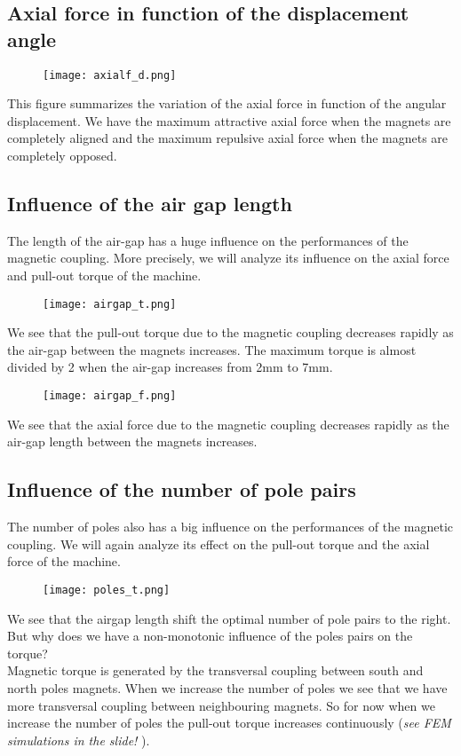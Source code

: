 \subsection*{Axial force in function of the displacement angle}
\begin{figure}[H]
    \centering
    \texttt{[image: axialf\_d.png]}
\end{figure}
This figure summarizes the variation of the axial force in function of the angular displacement. We have the maximum attractive axial force when the magnets are completely aligned and the maximum repulsive axial force when the magnets are completely opposed.

\subsection*{Influence of the air gap length}

The length of the air-gap has a huge influence on the performances of the magnetic coupling. More precisely, we will analyze its influence on the axial force and pull-out torque of the machine.
\begin{figure}[H]
    \centering
    \texttt{[image: airgap\_t.png]}
\end{figure}
We see that the pull-out torque due to the magnetic coupling decreases rapidly as the air-gap between the magnets increases. The maximum torque is almost divided by 2 when the air-gap increases from 2mm to 7mm.
\begin{figure}[H]
    \centering
    \texttt{[image: airgap\_f.png]}
\end{figure}
We see that the axial force due to the magnetic coupling decreases rapidly as the air-gap length between the magnets increases.

\subsection*{Influence of the number of pole pairs}
The number of poles also has a big influence on the performances of the magnetic coupling. We will again analyze its effect on the pull-out torque and the axial force of the machine.
\begin{figure}[H]
    \centering
    \texttt{[image: poles\_t.png]}
\end{figure}
We see that the airgap length shift the optimal number of pole pairs to the right. But why does we have a non-monotonic influence of the poles pairs on the torque?\\
Magnetic torque is generated by the transversal coupling between south and north poles magnets. When we increase the number of poles we see that we have more transversal coupling between neighbouring magnets. So for now when we increase the number of poles the pull-out torque increases continuously (\textit{see FEM simulations in the slide! }).

